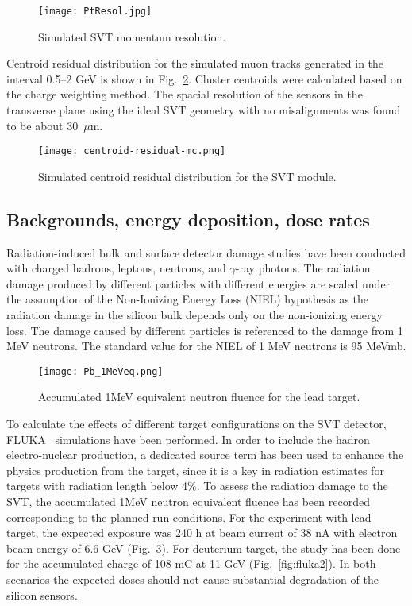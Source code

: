 \begin{figure}[hbt]
\texttt{[image: PtResol.jpg]}
\caption{Simulated SVT momentum resolution.}
\label{fig:PtRes}
\end{figure}

Centroid residual distribution for the simulated muon tracks generated in the interval 0.5--2 GeV is shown in Fig.~\ref{fig:centroid-residual-mc}. Cluster centroids were calculated based on the charge weighting method. The spacial resolution of the sensors in the transverse plane using the ideal SVT geometry with no misalignments was found to be about 30~$\mu$m. 

\begin{figure}[hbt]
\texttt{[image: centroid-residual-mc.png]}
\caption{Simulated centroid residual distribution for the SVT module.}
\label{fig:centroid-residual-mc}
\end{figure}

\subsection{Backgrounds, energy deposition, dose rates}

Radiation-induced bulk and surface detector damage studies have been conducted with charged hadrons, leptons, neutrons, and $\gamma$-ray photons. The radiation damage produced by different particles with different energies are scaled under the assumption of the Non-Ionizing Energy Loss (NIEL) hypothesis as the radiation damage in the silicon bulk depends only on the non-ionizing energy loss. The damage caused by different particles is referenced to the damage from 1 MeV neutrons. The standard value for the NIEL of 1 MeV neutrons is 95 MeVmb. 

\begin{figure}[hbt] 
\centering 
\texttt{[image: Pb\_1MeVeq.png]}
\caption{Accumulated 1MeV equivalent neutron fluence for the lead target.}
\label{fig:fluka1}
\end{figure}

To calculate the effects of different target configurations on the SVT detector,  FLUKA~\cite{FLUKA1, FLUKA2} simulations have been performed. In order to include the hadron electro-nuclear production, a dedicated source term has been used to enhance the physics production from the target, since it is a key in radiation estimates for targets with radiation length below 4$\%$. To assess the radiation damage to the SVT, the accumulated 1MeV neutron equivalent fluence has been recorded corresponding to the planned run conditions. For the experiment with lead target, the expected exposure was 240 h at beam current of 38 nA with electron beam energy of 6.6 GeV (Fig.~\ref{fig:fluka1}). For deuterium target, the study has been done for the accumulated charge of 108 mC at 11 GeV (Fig.~\ref{fig:fluka2}). In both scenarios the expected doses should not cause substantial degradation of the silicon sensors.

